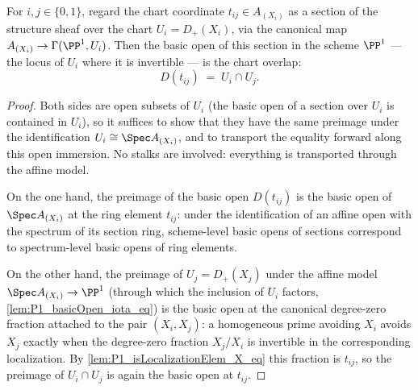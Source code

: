 \begin{theorem}
  \label{thm:P1_basicOpen_chartCoord}
  \leanok
  For \(i, j \in \{0,1\}\), regard the chart coordinate \(t_{ij} \in A_{(X_i)}\) as a
  section of the structure sheaf over the chart \(U_i = D_+(X_i)\), via the canonical map
  \(A_{(X_i)} \to \Gamma(\PP^1, U_i)\). Then the basic open of this section in the scheme
  \(\PP^1\) --- the locus of \(U_i\) where it is invertible --- is the chart overlap:
  \[
    D(t_{ij}) \;=\; U_i \cap U_j .
  \]
\end{theorem}
\begin{proof}
  \leanok
  Both sides are open subsets of \(U_i\) (the basic open of a section over \(U_i\) is
  contained in \(U_i\)), so it suffices to show that they have the same preimage under the
  identification \(U_i \cong \Spec A_{(X_i)}\), and to transport the equality forward
  along this open immersion. No stalks are involved: everything is transported through
  the affine model.

  On the one hand, the preimage of the basic open \(D(t_{ij})\) is the basic open of
  \(\Spec A_{(X_i)}\) at the ring element \(t_{ij}\): under the identification of an
  affine open with the spectrum of its section ring, scheme-level basic opens of sections
  correspond to spectrum-level basic opens of ring elements.

  On the other hand, the preimage of \(U_j = D_+(X_j)\) under the affine model
  \(\Spec A_{(X_i)} \to \PP^1\) (through which the inclusion of \(U_i\) factors,
  \ref{lem:P1_basicOpen_iota_eq}) is the basic open at the canonical degree-zero fraction
  attached to the pair \((X_i, X_j)\): a homogeneous prime avoiding \(X_i\) avoids
  \(X_j\) exactly when the degree-zero fraction \(X_j/X_i\) is invertible in the
  corresponding localization. By \ref{lem:P1_isLocalizationElem_X_eq} this fraction is
  \(t_{ij}\), so the preimage of \(U_i \cap U_j\) is again the basic open at
  \(t_{ij}\).
\end{proof}

